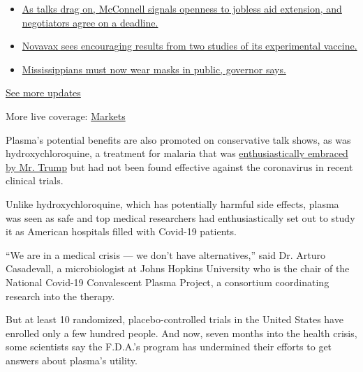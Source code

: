 \begin{itemize}
\tightlist
\item
  \href{https://www.nytimes.com/2020/08/04/world/coronavirus-cases.html?action=click\&pgtype=Article\&state=default\&region=MAIN_CONTENT_1\&context=storylines_live_updates\#link-762df92}{As
  talks drag on, McConnell signals openness to jobless aid extension,
  and negotiators agree on a deadline.}
\item
  \href{https://www.nytimes.com/2020/08/04/world/coronavirus-cases.html?action=click\&pgtype=Article\&state=default\&region=MAIN_CONTENT_1\&context=storylines_live_updates\#link-1228a480}{Novavax
  sees encouraging results from two studies of its experimental
  vaccine.}
\item
  \href{https://www.nytimes.com/2020/08/04/world/coronavirus-cases.html?action=click\&pgtype=Article\&state=default\&region=MAIN_CONTENT_1\&context=storylines_live_updates\#link-794484ed}{Mississippians
  must now wear masks in public, governor says.}
\end{itemize}

\href{https://www.nytimes.com/2020/08/04/world/coronavirus-cases.html?action=click\&pgtype=Article\&state=default\&region=MAIN_CONTENT_1\&context=storylines_live_updates}{See
more updates}

More live coverage:
\href{https://www.nytimes.com/live/2020/08/04/business/stock-market-today-coronavirus?action=click\&pgtype=Article\&state=default\&region=MAIN_CONTENT_1\&context=storylines_live_updates}{Markets}

Plasma's potential benefits are also promoted on conservative talk
shows, as was hydroxychloroquine, a treatment for malaria that was
\href{https://www.nytimes.com/2020/03/20/health/coronavirus-chloroquine-trump.html}{enthusiastically
embraced by Mr. Trump} but had not been found effective against the
coronavirus in recent clinical trials.

Unlike hydroxychloroquine, which has potentially harmful side effects,
plasma was seen as safe and top medical researchers had enthusiastically
set out to study it as American hospitals filled with Covid-19 patients.

``We are in a medical crisis --- we don't have alternatives,'' said Dr.
Arturo Casadevall, a microbiologist at Johns Hopkins University who is
the chair of the National Covid-19 Convalescent Plasma Project, a
consortium coordinating research into the therapy.

But at least 10 randomized, placebo-controlled trials in the United
States have enrolled only a few hundred people. And now, seven months
into the health crisis, some scientists say the F.D.A.'s program has
undermined their efforts to get answers about plasma's utility.

